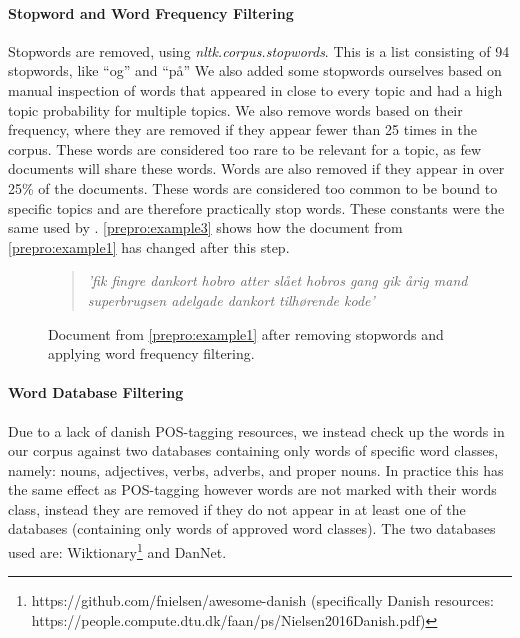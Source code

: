 \paragraph{Stopword and Word Frequency Filtering}
Stopwords are removed, using \emph{nltk.corpus.stopwords}. 
This is a list consisting of 94 stopwords, like ``og'' and ``på''
We also added some stopwords ourselves based on manual inspection of words that appeared in close to every topic and had a high topic probability for multiple topics.
We also remove words based on their frequency, where they are removed if they appear fewer than 25 times in the corpus.
These words are considered too rare to be relevant for a topic, as few documents will share these words.
Words are also removed if they appear in over 25\% of the documents.
These words are considered too common to be bound to specific topics and are therefore practically stop words.
These constants were the same used by \cite{quanti}.
\autoref{prepro:example3} shows how the document from \autoref{prepro:example1} has changed after this step.
\begin{figure}[h]
	\begin{framed}
		\begin{quote}
			\textit{
				'fik fingre dankort hobro atter slået hobros gang gik årig mand superbrugsen adelgade dankort tilhørende kode'
			}
		\end{quote}
	\end{framed}
	\caption{Document from \autoref{prepro:example1} after removing stopwords and applying word frequency filtering.}
	\label{prepro:example3}
\end{figure}


\paragraph{Word Database Filtering}
Due to a lack of danish POS-tagging resources, we instead check up the words in our corpus against two databases containing only words of specific word classes, namely: nouns, adjectives, verbs, adverbs, and proper nouns.
In practice this has the same effect as POS-tagging however words are not marked with their words class, instead they are removed if they do not appear in at least one of the databases (containing only words of approved word classes).
The two databases used are:  Wiktionary\footnote{https://github.com/fnielsen/awesome-danish (specifically Danish resources: https://people.compute.dtu.dk/faan/ps/Nielsen2016Danish.pdf)} and DanNet\cite{Pedersen2009DanNetTC}. 


